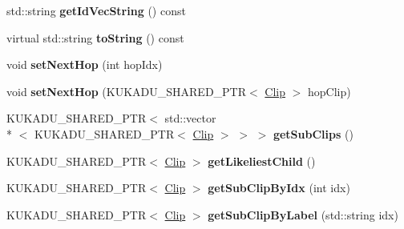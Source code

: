 \begin{DoxyCompactItemize}
\item 
\hypertarget{classkukadu_1_1Clip_a0e794578f3fcb41fd6dd499c22c30565}{std\-::string {\bfseries get\-Id\-Vec\-String} () const }\label{classkukadu_1_1Clip_a0e794578f3fcb41fd6dd499c22c30565}

\item 
\hypertarget{classkukadu_1_1Clip_abf1bb19d4b0094d616f543120dedbd7d}{virtual std\-::string {\bfseries to\-String} () const }\label{classkukadu_1_1Clip_abf1bb19d4b0094d616f543120dedbd7d}

\item 
\hypertarget{classkukadu_1_1Clip_a6b905b49fbab541a181a6883da7a868a}{void {\bfseries set\-Next\-Hop} (int hop\-Idx)}\label{classkukadu_1_1Clip_a6b905b49fbab541a181a6883da7a868a}

\item 
\hypertarget{classkukadu_1_1Clip_a0d4f9f3ecb5df4734e3d46a98a237ee7}{void {\bfseries set\-Next\-Hop} (K\-U\-K\-A\-D\-U\-\_\-\-S\-H\-A\-R\-E\-D\-\_\-\-P\-T\-R$<$ \hyperlink{classkukadu_1_1Clip}{Clip} $>$ hop\-Clip)}\label{classkukadu_1_1Clip_a0d4f9f3ecb5df4734e3d46a98a237ee7}

\item 
\hypertarget{classkukadu_1_1Clip_acdfec2bfb4968418b9b24696af6b07a6}{K\-U\-K\-A\-D\-U\-\_\-\-S\-H\-A\-R\-E\-D\-\_\-\-P\-T\-R$<$ std\-::vector\\*
$<$ K\-U\-K\-A\-D\-U\-\_\-\-S\-H\-A\-R\-E\-D\-\_\-\-P\-T\-R$<$ \hyperlink{classkukadu_1_1Clip}{Clip} $>$ $>$ $>$ {\bfseries get\-Sub\-Clips} ()}\label{classkukadu_1_1Clip_acdfec2bfb4968418b9b24696af6b07a6}

\item 
\hypertarget{classkukadu_1_1Clip_ab6089133084f49019e2fd6e6373c67e8}{K\-U\-K\-A\-D\-U\-\_\-\-S\-H\-A\-R\-E\-D\-\_\-\-P\-T\-R$<$ \hyperlink{classkukadu_1_1Clip}{Clip} $>$ {\bfseries get\-Likeliest\-Child} ()}\label{classkukadu_1_1Clip_ab6089133084f49019e2fd6e6373c67e8}

\item 
\hypertarget{classkukadu_1_1Clip_a97677251b01b02c3b4800d04ca6ad07e}{K\-U\-K\-A\-D\-U\-\_\-\-S\-H\-A\-R\-E\-D\-\_\-\-P\-T\-R$<$ \hyperlink{classkukadu_1_1Clip}{Clip} $>$ {\bfseries get\-Sub\-Clip\-By\-Idx} (int idx)}\label{classkukadu_1_1Clip_a97677251b01b02c3b4800d04ca6ad07e}

\item 
\hypertarget{classkukadu_1_1Clip_af046e5a1afee00613e11fcb2e48d28fc}{K\-U\-K\-A\-D\-U\-\_\-\-S\-H\-A\-R\-E\-D\-\_\-\-P\-T\-R$<$ \hyperlink{classkukadu_1_1Clip}{Clip} $>$ {\bfseries get\-Sub\-Clip\-By\-Label} (std\-::string idx)}\label{classkukadu_1_1Clip_af046e5a1afee00613e11fcb2e48d28fc}


\end{DoxyCompactItemize}
